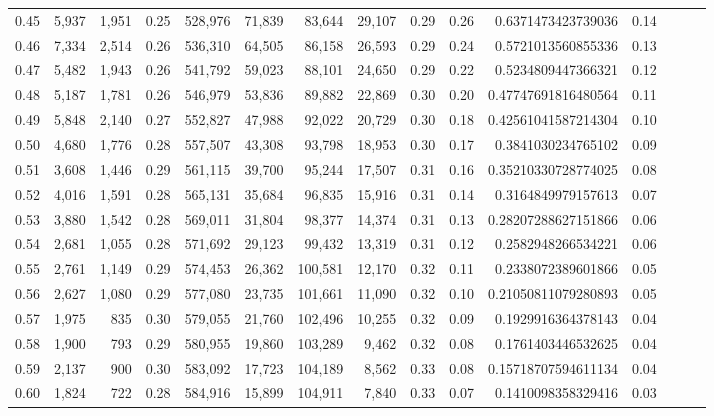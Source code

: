 \begin{tabular}{rrrrrrrrrrrrrrr}
0.45 &   5,937 &  1,951 &  0.25 &  528,976 &   71,839 &   83,644 &   29,107 &  0.29 &  0.26 &      0.6371473423739036 &      0.14 \\
0.46 &   7,334 &  2,514 &  0.26 &  536,310 &   64,505 &   86,158 &   26,593 &  0.29 &  0.24 &      0.5721013560855336 &      0.13 \\
0.47 &   5,482 &  1,943 &  0.26 &  541,792 &   59,023 &   88,101 &   24,650 &  0.29 &  0.22 &      0.5234809447366321 &      0.12 \\
0.48 &   5,187 &  1,781 &  0.26 &  546,979 &   53,836 &   89,882 &   22,869 &  0.30 &  0.20 &     0.47747691816480564 &      0.11 \\
0.49 &   5,848 &  2,140 &  0.27 &  552,827 &   47,988 &   92,022 &   20,729 &  0.30 &  0.18 &     0.42561041587214304 &      0.10 \\
0.50 &   4,680 &  1,776 &  0.28 &  557,507 &   43,308 &   93,798 &   18,953 &  0.30 &  0.17 &      0.3841030234765102 &      0.09 \\
0.51 &   3,608 &  1,446 &  0.29 &  561,115 &   39,700 &   95,244 &   17,507 &  0.31 &  0.16 &     0.35210330728774025 &      0.08 \\
0.52 &   4,016 &  1,591 &  0.28 &  565,131 &   35,684 &   96,835 &   15,916 &  0.31 &  0.14 &      0.3164849979157613 &      0.07 \\
0.53 &   3,880 &  1,542 &  0.28 &  569,011 &   31,804 &   98,377 &   14,374 &  0.31 &  0.13 &     0.28207288627151866 &      0.06 \\
0.54 &   2,681 &  1,055 &  0.28 &  571,692 &   29,123 &   99,432 &   13,319 &  0.31 &  0.12 &      0.2582948266534221 &      0.06 \\
0.55 &   2,761 &  1,149 &  0.29 &  574,453 &   26,362 &  100,581 &   12,170 &  0.32 &  0.11 &      0.2338072389601866 &      0.05 \\
0.56 &   2,627 &  1,080 &  0.29 &  577,080 &   23,735 &  101,661 &   11,090 &  0.32 &  0.10 &     0.21050811079280893 &      0.05 \\
0.57 &   1,975 &    835 &  0.30 &  579,055 &   21,760 &  102,496 &   10,255 &  0.32 &  0.09 &      0.1929916364378143 &      0.04 \\
0.58 &   1,900 &    793 &  0.29 &  580,955 &   19,860 &  103,289 &    9,462 &  0.32 &  0.08 &      0.1761403446532625 &      0.04 \\
0.59 &   2,137 &    900 &  0.30 &  583,092 &   17,723 &  104,189 &    8,562 &  0.33 &  0.08 &     0.15718707594611134 &      0.04 \\
0.60 &   1,824 &    722 &  0.28 &  584,916 &   15,899 &  104,911 &    7,840 &  0.33 &  0.07 &      0.1410098358329416 &      0.03 \\

\end{tabular}
